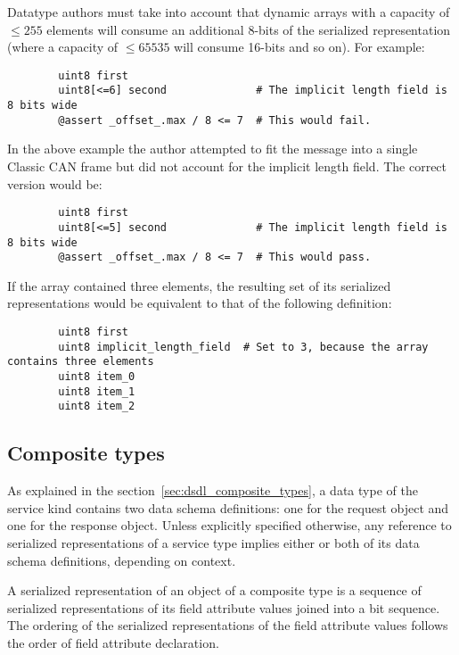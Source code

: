 \begin{remark}
    Datatype authors must take into account that dynamic arrays with a capacity of $\leq{}255$ elements will
    consume an additional 8-bits of the serialized representation (where a capacity of $\leq 65535$ will consume 16-bits and so on).
    For example:

    \begin{verbatim}
        uint8 first
        uint8[<=6] second              # The implicit length field is 8 bits wide
        @assert _offset_.max / 8 <= 7  # This would fail.
    \end{verbatim}

    In the above example the author attempted to fit the message into a single Classic CAN frame but
    did not account for the implicit length field. The correct version would be:

    \begin{verbatim}
        uint8 first
        uint8[<=5] second              # The implicit length field is 8 bits wide
        @assert _offset_.max / 8 <= 7  # This would pass.
    \end{verbatim}

    If the array contained three elements, the resulting set of its serialized representations would
    be equivalent to that of the following definition:

    \begin{verbatim}
        uint8 first
        uint8 implicit_length_field  # Set to 3, because the array contains three elements
        uint8 item_0
        uint8 item_1
        uint8 item_2
    \end{verbatim}
\end{remark}

\subsection{Composite types}

As explained in the section~\ref{sec:dsdl_composite_types}, a data type of the service kind contains
two data schema definitions: one for the request object and one for the response object.
Unless explicitly specified otherwise, any reference to serialized representations of a service type
implies either or both of its data schema definitions, depending on context.

A serialized representation of an object of a composite type is a sequence of serialized representations of
its field attribute values joined into a bit sequence.
The ordering of the serialized representations of the field attribute values follows the order
of field attribute declaration.

